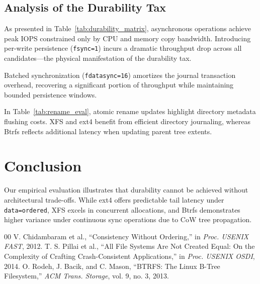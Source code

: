 \documentclass[conference]{IEEEtran}
\begin{document}
\subsection{Analysis of the Durability Tax}
As presented in Table~\ref{tab:durability_matrix}, asynchronous operations achieve peak IOPS constrained only by CPU and memory copy bandwidth. Introducing per-write persistence (\texttt{fsync=1}) incurs a dramatic throughput drop across all candidates---the physical manifestation of the durability tax. 

Batched synchronization (\texttt{fdatasync=16}) amortizes the journal transaction overhead, recovering a significant portion of throughput while maintaining bounded persistence windows.

In Table~\ref{tab:rename_eval}, atomic rename updates highlight directory metadata flushing costs. XFS and ext4 benefit from efficient directory journaling, whereas Btrfs reflects additional latency when updating parent tree extents.

\section{Conclusion}
Our empirical evaluation illustrates that durability cannot be achieved without architectural trade-offs. While ext4 offers predictable tail latency under \texttt{data=ordered}, XFS excels in concurrent allocations, and Btrfs demonstrates higher variance under continuous sync operations due to CoW tree propagation.

\begin{thebibliography}{00}
 V. Chidambaram et al., ``Consistency Without Ordering,'' in \textit{Proc. USENIX FAST}, 2012.
 T. S. Pillai et al., ``All File Systems Are Not Created Equal: On the Complexity of Crafting Crash-Consistent Applications,'' in \textit{Proc. USENIX OSDI}, 2014.
 O. Rodeh, J. Bacik, and C. Mason, ``BTRFS: The Linux B-Tree Filesystem,'' \textit{ACM Trans. Storage}, vol. 9, no. 3, 2013.
\end{thebibliography}
\end{document}
